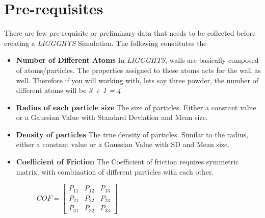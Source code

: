 \documentclass{tufte-book} %
\newcommand{\Li}{\textit{LIGGGHTS}\xspace}
\begin{document}
\section{Pre-requisites}

There are few pre-requisite or preliminary data that needs to be collected before creating a \Li Simulation. The following constitutes the
\begin{itemize}
\item \textbf{Number of Different Atoms}
  In \Li, walls are basically composed of atoms/particles. The properties assigned to these atoms acts for the wall as well. Therefore if you will working with, lets say three powder, the number of different atoms will be \textit{3 + 1 = 4}
\item \textbf{Radius of each particle size} The size of particles. Either a constant value or a Gaussian Value with Standard Deviation and Mean size.
\item\textbf{ Density of particles} The true density of particles. Similar to the radius, either a constant value or a Gaussian Value with SD and Mean size.
\item \textbf{Coefficient of Friction} The Coefficient of friction requires symmetric matrix, with combination of different particles with each other.
  \begin{figure}
    \centering
    $COF =
    \begin{bmatrix}
      P_{11}&P_{12}&P_{13}\\ P_{21}&P_{22}&P_{23} \\
      P_{31}&P_{32}&P_{33}
   
    \end{bmatrix}$
     

\end{figure}
\end{itemize}
\end{document}
